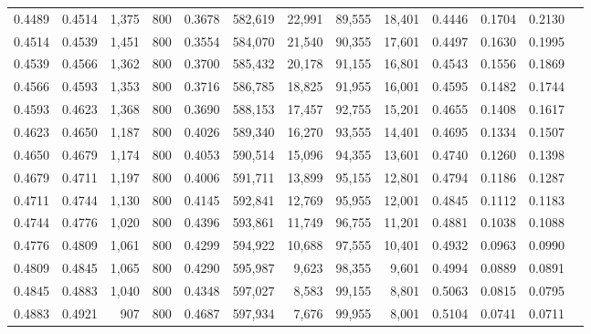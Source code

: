 \begin{tabular}{rrrrrrrrrrrrr}
0.4489 & 0.4514 &  1,375 &   800 &                                     0.3678 & 582,619 &  22,991 &  89,555 &  18,401 & 0.4446 & 0.1704 & 0.2130 \\
0.4514 & 0.4539 &  1,451 &   800 &                                     0.3554 & 584,070 &  21,540 &  90,355 &  17,601 & 0.4497 & 0.1630 & 0.1995 \\
0.4539 & 0.4566 &  1,362 &   800 &                                     0.3700 & 585,432 &  20,178 &  91,155 &  16,801 & 0.4543 & 0.1556 & 0.1869 \\
0.4566 & 0.4593 &  1,353 &   800 &                                     0.3716 & 586,785 &  18,825 &  91,955 &  16,001 & 0.4595 & 0.1482 & 0.1744 \\
0.4593 & 0.4623 &  1,368 &   800 &                                     0.3690 & 588,153 &  17,457 &  92,755 &  15,201 & 0.4655 & 0.1408 & 0.1617 \\
0.4623 & 0.4650 &  1,187 &   800 &                                     0.4026 & 589,340 &  16,270 &  93,555 &  14,401 & 0.4695 & 0.1334 & 0.1507 \\
0.4650 & 0.4679 &  1,174 &   800 &                                     0.4053 & 590,514 &  15,096 &  94,355 &  13,601 & 0.4740 & 0.1260 & 0.1398 \\
0.4679 & 0.4711 &  1,197 &   800 &                                     0.4006 & 591,711 &  13,899 &  95,155 &  12,801 & 0.4794 & 0.1186 & 0.1287 \\
0.4711 & 0.4744 &  1,130 &   800 &                                     0.4145 & 592,841 &  12,769 &  95,955 &  12,001 & 0.4845 & 0.1112 & 0.1183 \\
0.4744 & 0.4776 &  1,020 &   800 &                                     0.4396 & 593,861 &  11,749 &  96,755 &  11,201 & 0.4881 & 0.1038 & 0.1088 \\
0.4776 & 0.4809 &  1,061 &   800 &                                     0.4299 & 594,922 &  10,688 &  97,555 &  10,401 & 0.4932 & 0.0963 & 0.0990 \\
0.4809 & 0.4845 &  1,065 &   800 &                                     0.4290 & 595,987 &   9,623 &  98,355 &   9,601 & 0.4994 & 0.0889 & 0.0891 \\
0.4845 & 0.4883 &  1,040 &   800 &                                     0.4348 & 597,027 &   8,583 &  99,155 &   8,801 & 0.5063 & 0.0815 & 0.0795 \\
0.4883 & 0.4921 &    907 &   800 &                                     0.4687 & 597,934 &   7,676 &  99,955 &   8,001 & 0.5104 & 0.0741 & 0.0711 \\

\end{tabular}
